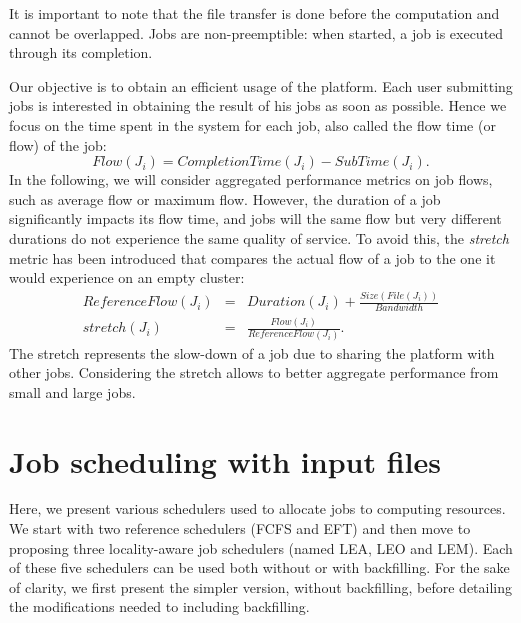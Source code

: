 \documentclass[conference,10pt]{IEEEtran}
\newcommand{\file}{\ensuremath{\mathit{File}}\xspace}
\newcommand{\size}{\ensuremath{\mathit{Size}}\xspace}
\newcommand{\duration}{\mathit{Duration}\xspace}
\newcommand{\bandwidth}{\mathit{Bandwidth}\xspace}
\newcommand{\submissiontime}{\mathit{SubTime}\xspace}
\newcommand{\emptyflow}{\mathit{ReferenceFlow}\xspace}
\newcommand{\completiontime}{\mathit{CompletionTime}\xspace}
\newcommand{\start}{\mathit{StartTime}\xspace}
\begin{document}
It is important to note that the file transfer is done before the computation and cannot be overlapped.
Jobs are non-preemptible: when started, a job is executed through its completion.

Our objective is to obtain an efficient usage of the platform. Each
user submitting jobs is interested in obtaining the result of his jobs
as soon as possible. Hence we focus on the time spent in the system
for each job, also called the flow time (or flow) of the job:
$$
\mathit{Flow}(J_i) = \completiontime(J_i) - \submissiontime(J_i).
$$
In the following, we will consider aggregated performance metrics on
job flows, such as average flow or maximum flow. However, the duration
of a job significantly impacts its flow time, and jobs will the same
flow but very different durations do not experience the same quality
of service. To avoid this, the \emph{stretch} metric has been
introduced that compares the actual flow of a job to the one it would
experience on an empty cluster:
\begin{eqnarray*}
\emptyflow(J_i) &=& \duration(J_i) + \frac{\size(\file(J_i))}{\bandwidth}\\
\mathit{stretch}(J_i) &=& \frac{\mathit{Flow}(J_i)}{\emptyflow(J_i)}.
\end{eqnarray*}
The stretch represents the slow-down of a job due to sharing the
platform with other jobs. Considering the stretch
allows to better aggregate performance from small and large jobs.



\section{Job scheduling with input files}\label{sec.schedulers}


Here, we present various schedulers used to allocate jobs to
computing resources. We start with two reference schedulers (FCFS and EFT)
and then move to proposing three locality-aware job schedulers (named
LEA, LEO and LEM). Each of these five schedulers can be used both
without or with backfilling. For the sake of clarity, we first present
the simpler version, without backfilling, before detailing the modifications needed to including backfilling.
\end{document}
